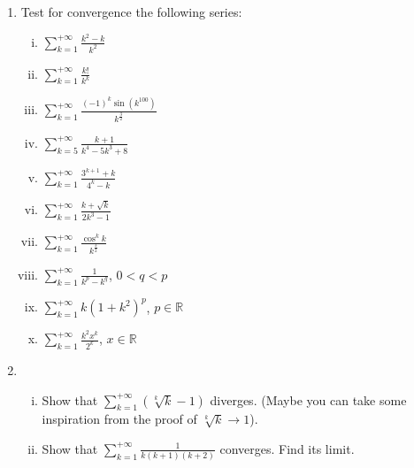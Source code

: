 \documentclass[11pt]{amsart}
\newcommand\R{{\mathbb{R}}}
\theoremstyle{plain}
\theoremstyle{definition}
\numberwithin{equation}{section}
\begin{document}
\begin{enumerate}
\item Test for convergence the following series:
\begin{enumerate}[(i)]
\item $\sum_{k=1}^{+\infty}\frac{k^2-k}{k^2}$
\vspace{0.1in}
\item $\sum_{k=1}^{+\infty}\frac{k!}{k^k}$
\vspace{0.1in}
\item $\sum_{k=1}^{+\infty}\frac{(-1)^k\sin(k^{100})}{k^{\frac{3}{2}}}$
\vspace{0.1in}
\item $\sum_{k=5}^{+\infty}\frac{k+1}{k^4-5k^3+8}$
\vspace{0.1in}
\item $\sum_{k=1}^{+\infty}\frac{3^{k+1}+k}{4^k-k}$
\vspace{0.1in}
\item $\sum_{k=1}^{+\infty}\frac{k+\sqrt{k}}{2k^3-1}$
\vspace{0.1in}
\item $\sum_{k=1}^{+\infty}\frac{\cos^kk}{k^{\frac{3}{2}}}$
\vspace{0.1in}
\item $\sum_{k=1}^{+\infty}\frac{1}{k^p-k^q}$, $0<q<p$
\vspace{0.1in}
\item $\sum_{k=1}^{+\infty}k(1+k^2)^p$, $p\in\R$
\vspace{0.1in}
\item $\sum_{k=1}^{+\infty}\frac{k^2x^k}{2^k}$, $x\in\R$

\end{enumerate}
\vspace{0.4in}

\item
\begin{enumerate}[(i)]
\item Show that $\sum_{k=1}^{+\infty}(\sqrt[k]{k}-1)$ diverges. (Maybe you can take some inspiration from the proof of $\sqrt[k]{k}\rightarrow 1$).
\vspace{0.1in}
\item Show that $\sum_{k=1}^{+\infty}\frac{1}{k(k+1)(k+2)}$ converges. Find its limit.
\end{enumerate}

\end{enumerate}
\end{document}
